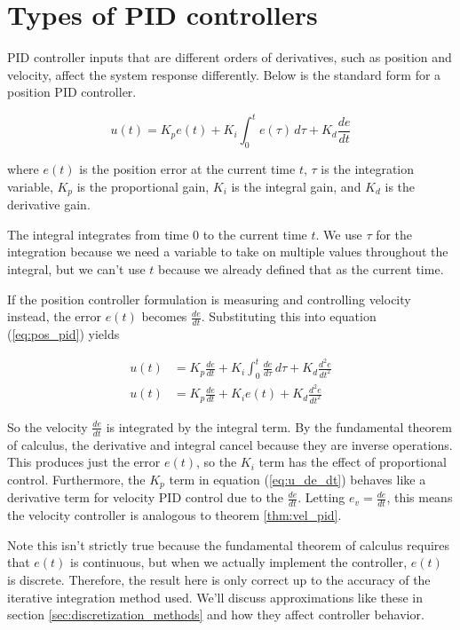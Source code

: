 \section{Types of PID controllers}

PID controller inputs that are different orders of derivatives, such as position
and velocity, affect the \gls{system response} differently. Below is the
standard form for a position PID controller.

\begin{definition}
  \begin{equation}
    u(t) = K_p e(t) + K_i \int_0^t e(\tau) \,d\tau + K_d \frac{de}{dt}
    \label{eq:pos_pid}
  \end{equation}

  where $e(t)$ is the position error at the current time $t$, $\tau$ is the
  integration variable, $K_p$ is the proportional gain, $K_i$ is the integral
  gain, and $K_d$ is the derivative gain.
\end{definition}

The integral integrates from time $0$ to the current time $t$. We use $\tau$ for
the integration because we need a variable to take on multiple values throughout
the integral, but we can't use $t$ because we already defined that as the
current time.

If the position controller formulation is measuring and controlling velocity
instead, the error $e(t)$ becomes $\frac{de}{dt}$. Substituting this into
equation (\ref{eq:pos_pid}) yields

\begin{align}
  u(t) &= K_p \frac{de}{dt} + K_i \int_0^t \frac{de}{d\tau} \,d\tau +
    K_d \frac{d^2e}{dt^2} \nonumber \\
  u(t) &= K_p \frac{de}{dt} + K_i e(t) + K_d \frac{d^2e}{dt^2}
    \label{eq:u_de_dt}
\end{align}

So the velocity $\frac{de}{dt}$ is integrated by the integral term. By the
fundamental theorem of calculus, the derivative and integral cancel because they
are inverse operations. This produces just the error $e(t)$, so the $K_i$ term
has the effect of proportional control. Furthermore, the $K_p$ term in equation
(\ref{eq:u_de_dt}) behaves like a derivative term for velocity PID control due
to the $\frac{de}{dt}$. Letting $e_v = \frac{de}{dt}$, this means the velocity
controller is analogous to theorem \ref{thm:vel_pid}.

Note this isn't strictly true because the fundamental theorem of calculus
requires that $e(t)$ is continuous, but when we actually implement the
controller, $e(t)$ is discrete. Therefore, the result here is only correct up to
the accuracy of the iterative integration method used. We'll discuss
approximations like these in section \ref{sec:discretization_methods} and how
they affect controller behavior.

